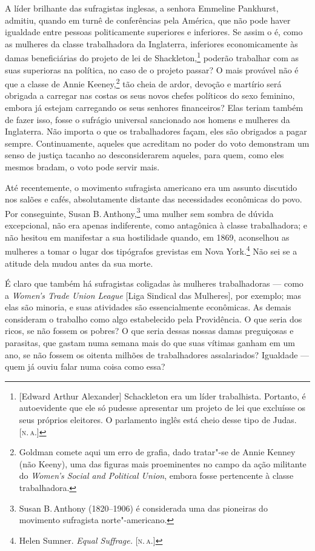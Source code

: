 A líder brilhante das sufragistas inglesas, a senhora Emmeline
Pankhurst, admitiu, quando em turnê de conferências pela América, que não
pode haver igualdade entre pessoas politicamente superiores e
inferiores. Se assim o é, como as mulheres da classe trabalhadora da
Inglaterra, inferiores economicamente às damas beneficiárias do projeto
de lei de Shackleton,\footnote{{[}Edward Arthur Alexander{]} Schackleton
  era um líder trabalhista. Portanto, é autoevidente que ele só pudesse
  apresentar um projeto de lei que excluísse os seus próprios eleitores.
  O parlamento inglês está cheio desse tipo de Judas. [\textsc{n.\,a.}]} poderão
trabalhar com as suas superioras na política, no caso de o projeto passar? %
O mais provável não é que a classe de Annie Keeney,\footnote{Goldman comete aqui um
  erro de grafia, dado tratar"-se de Annie Kenney (não Keeny), uma das
  figuras mais proeminentes no campo da ação militante do \emph{Women's
  Social and Political Union}, embora fosse pertencente à classe
  trabalhadora.} tão cheia de ardor, devoção e martírio será obrigada a
carregar nas costas os seus novos chefes políticos do sexo feminino, embora já
estejam carregando os seus senhores financeiros? Elas teriam também de
fazer isso, fosse o sufrágio universal sancionado aos homens e mulheres da
Inglaterra. Não importa o que os trabalhadores façam, eles são obrigados
a pagar sempre. Continuamente, aqueles que acreditam no poder do voto
demonstram um senso de justiça tacanho ao desconsiderarem aqueles, para
quem, como eles mesmos bradam, o voto pode servir mais.

Até recentemente, o movimento sufragista americano era um assunto
discutido nos salões e cafés, absolutamente distante das necessidades
econômicas do povo. Por conseguinte, Susan B.\,Anthony,\footnote{Susan B.\,Anthony (1820--1906) é considerada uma das pioneiras do movimento sufragista norte"-americano.} uma mulher sem
sombra de dúvida excepcional, não era apenas indiferente, como
antagônica à classe trabalhadora; e não hesitou em manifestar a sua
hostilidade quando, em 1869, aconselhou as mulheres a tomar o lugar dos
tipógrafos grevistas em Nova York.\footnote{Helen Sumner. \emph{Equal
  Suffrage.} [\textsc{n.\,a.}]} Não sei se a atitude dela mudou antes da sua morte.

É claro que também há sufragistas coligadas às mulheres trabalhadoras
--- como a \emph{Women's Trade Union League} {[}Liga Sindical das
Mulheres{]}, por exemplo; mas elas são minoria, e suas atividades
são essencialmente econômicas. As demais consideram o trabalho como algo
estabelecido pela Providência. O que seria dos ricos, se não fossem
os pobres? O que seria dessas nossas damas preguiçosas e parasitas, que
gastam numa semana mais do que suas vítimas ganham em um ano, se não
fossem os oitenta milhões de trabalhadores assalariados? Igualdade --- quem já ouviu falar numa coisa como essa?

